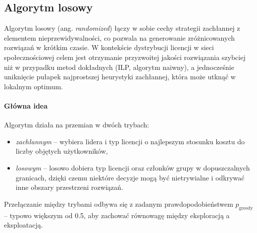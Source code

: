 \subsection{Algorytm losowy}

Algorytm losowy (ang. \emph{randomized}) łączy w sobie cechy strategii zachłannej z elementem nieprzewidywalności, co pozwala na generowanie zróżnicowanych rozwiązań w krótkim czasie. W kontekście dystrybucji licencji w sieci społecznościowej celem jest otrzymanie przyzwoitej jakości rozwiązania szybciej niż w przypadku metod dokładnych (ILP, algorytm naiwny), a jednocześnie uniknięcie pułapek najprostszej heurystyki zachłannej, która może utknąć w lokalnym optimum.

\paragraph{Główna idea}  
Algorytm działa na przemian w dwóch trybach:
\begin{itemize}
  \item \emph{zachłannym} – wybiera lidera i typ licencji o najlepszym stosunku kosztu do liczby objętych użytkowników,  
  \item \emph{losowym} – losowo dobiera typ licencji oraz członków grupy w dopuszczalnych granicach, dzięki czemu niektóre decyzje mogą być nietrywialne i odkrywać inne obszary przestrzeni rozwiązań.
\end{itemize}
Przełączanie między trybami odbywa się z zadanym prawdopodobieństwem $p_\mathrm{greedy}$ – typowo większym od 0.5, aby zachować równowagę między eksploracją a eksploatacją.

